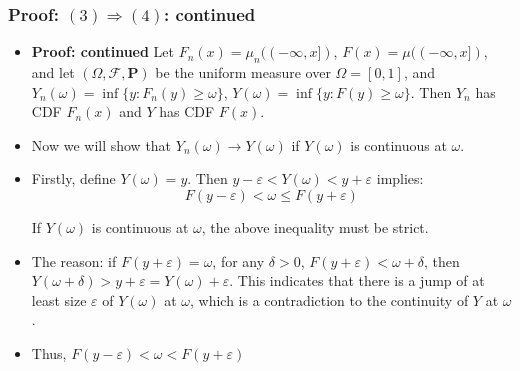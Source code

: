 \documentclass[handout]{beamer}
\newcommand{\BP}{\mathbf{P}}
\begin{document}
\frame
{
  \frametitle{Proof: $(3) \Rightarrow (4)$: continued} 

   \begin{itemize}
          
                     
                     \item<1-> \textbf{Proof: continued} Let $F_n(x)=\mu_n((-\infty, x])$, $F(x)=\mu((-\infty, x])$, and let $(\Omega, \mathcal{F}, \BP)$ be the uniform measure over $\Omega=[0,1]$, and $Y_n(\omega)=\inf \{y: F_n(y) \geq \omega\}$, $Y(\omega)=\inf \{y: F(y) \geq \omega\}$. Then $Y_n$ has CDF $F_n(x)$ and $Y$ has CDF $F(x)$.  
                     
                     
                     \item<2->[-] Now we will show that $Y_n(\omega)\rightarrow Y(\omega)$ if $Y(\omega)$ is continuous at $\omega$. 
                     
                         \item<3->[-] Firstly, define $Y(\omega) = y$. Then $y-\varepsilon<Y(\omega)< y+\varepsilon$ implies:
                                                  $$F(y-\varepsilon)< \omega \leq F(y+\varepsilon) $$
                         
                        If $Y(\omega)$ is continuous at $\omega$, the above inequality must be strict. 
                         
                   
                   \item<4->[-] The reason: if $F(y+\varepsilon)=\omega$, for any $\delta>0$, $F(y+\varepsilon)<\omega+\delta$, then $Y(\omega+\delta)>y+\varepsilon=Y(\omega)+\varepsilon$. This indicates that there is a jump of at least size $\varepsilon$ of $Y(\omega)$ at $\omega$, which is a contradiction to the continuity of $Y$ at $\omega$. 
                   
                        \item<5->[-] Thus,    $F(y-\varepsilon)<\omega< F(y+\varepsilon) $
                                         
                                               \end{itemize}
}
\end{document}

